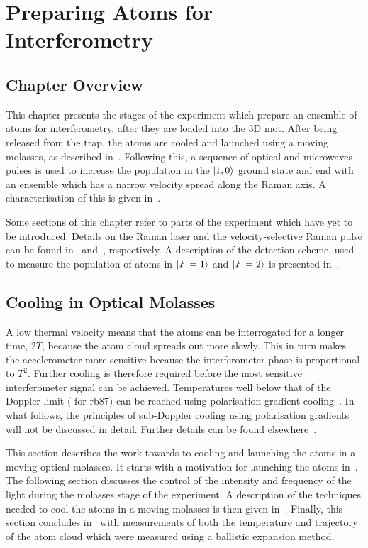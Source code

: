 \chapter{Preparing Atoms for Interferometry}\label{chap:atom_prep}
\section{Chapter Overview}
This chapter presents the stages of the experiment which prepare an
ensemble of atoms for interferometry, after they are loaded into the
3D \ac{mot}. After being released from the trap, the atoms are cooled
and launched using a moving molasses, as described
in~. Following this, a sequence of
optical and microwaves pulses is used to increase the population in
the \(\ket{1,0}\) ground state and end with an ensemble which has a
narrow velocity spread along the Raman axis. A characterisation of
this is given in~.
\par\noindent
Some sections of this chapter refer to parts of the experiment which
have yet to be introduced. Details on the Raman laser and the
velocity-selective Raman pulse can be found
in~
and~, respectively. A
description of the detection scheme, used to measure the population of
atoms in \(\ket{F=1}\) and \(\ket{F=2}\) is presented
in~.

\section{Cooling in Optical Molasses}\label{sec:optical_molasses}
A low thermal velocity means that the atoms can be interrogated for a
longer time, $2T$, because the atom cloud spreads out more slowly.
This in turn makes the accelerometer more sensitive because the
interferometer phase is proportional to $T^2$. 
Further cooling is therefore required before the most sensitive
interferometer signal can be achieved. Temperatures well below that of
the Doppler limit ( for \ac{rb87}) can be
reached using polarisation gradient cooling~\cite{Salomon1990}. In what follows, the principles of
sub-Doppler cooling using polarisation gradients will not be discussed
in detail. Further details can be found
elsewhere~\cite{Dalibard1989,Berg-Sorensent1992}. 

\par\noindent
This section describes the work towards to cooling and launching the
atoms in a moving optical molasses. It starts with a motivation for
launching the atoms in~. The following
section discusses the control of the intensity and frequency of the
light during the molasses stage of the experiment. A description of
the techniques needed to cool the atoms in a moving molasses is then
given in~. Finally, this section
concludes in~ with measurements of
both the temperature and trajectory of the atom cloud which were
measured using a ballistic expansion method.


